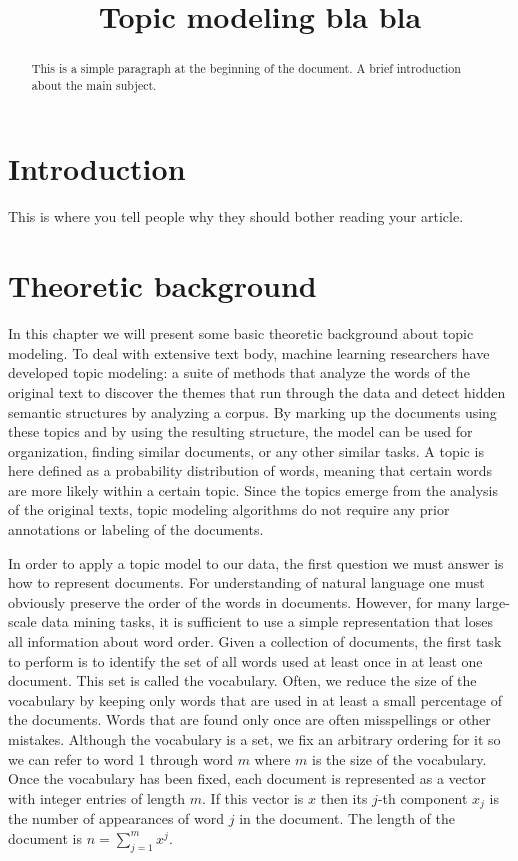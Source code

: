 \documentclass[12pt]{report}
\title{Topic modeling bla bla}
\begin{document}
\maketitle
\tableofcontents


\begin{abstract}
This is a simple paragraph at the beginning of the document. 
A brief introduction about the main subject.
\end{abstract}


\section{Introduction}
This is where you tell people why they should bother reading your article.


\section{Theoretic background}

In this chapter we will present some basic theoretic background about topic
modeling. To deal with extensive text body, machine learning researchers have
developed topic modeling: a suite of methods that analyze the words of the
original text to discover the themes that run through the data and detect
hidden semantic structures by analyzing a corpus. By marking up the documents
using these topics and by using the resulting structure, the model can be used
for organization, finding similar documents, or any other similar tasks. A
topic is here defined as a probability distribution of words, meaning that
certain words are more likely within a certain topic. Since the topics emerge
from the analysis of the original texts, topic modeling algorithms do not
require any prior annotations or labeling of the documents.

In order to apply a topic model to our data, the first question we must answer
is how to represent documents. For understanding of natural language one must
obviously preserve the order of the words in documents. However, for many
large-scale data mining tasks, it is sufficient to use a simple representation
that loses all information about word order. Given a collection of documents,
the first task to perform is to identify the set of all words used at least
once in at least one document. This set is called the vocabulary. Often, we
reduce the size of the vocabulary by keeping only words that are used in at
least a small percentage of the documents. Words that are found only once are
often misspellings or other mistakes. Although the vocabulary is a set, we fix
an arbitrary ordering for it so we can refer to word 1 through word $m$ where
$m$ is the size of the vocabulary. Once the vocabulary has been fixed, each
document is represented as a vector with integer entries of length $m$. If this
vector is $x$ then its $j$-th component $x_j$ is the number of appearances of
word $j$ in the document. The length of the document is $n=\sum\limits_{j=1}^m
x^j$.
\end{document}
